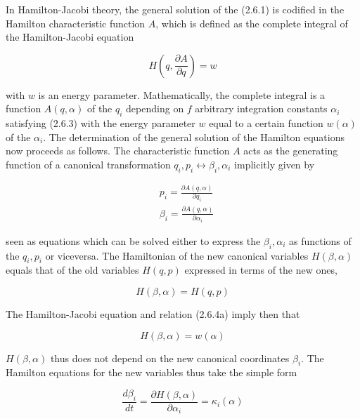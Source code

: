 \documentclass{article}
\begin{document}
In Hamilton-Jacobi theory, the general solution of the (2.6.1) is codified in the Hamilton characteristic function $A$, which is defined as the complete integral of the Hamilton-Jacobi equation
 
\begin{equation*}
H\left(q, \frac{\partial A}{\partial q}\right)=w \tag{2.6.3}
\end{equation*}
 
with $w$ is an energy parameter. Mathematically, the complete integral is a function $A(q, \alpha)$ of the $q_{i}$ depending on $f$ arbitrary integration constants $\alpha_{i}$ satisfying (2.6.3) with the energy parameter $w$ equal to a certain function $w(\alpha)$ of the $\alpha_{i}$. The determination of the general solution of the Hamilton equations now proceeds as follows. The characteristic function $A$ acts as the generating function of a canonical transformation $q_{i}, p_{i} \leftrightarrow \beta_{i}, \alpha_{i}$ implicitly given by
 
\begin{align*}
& p_{i}=\frac{\partial A(q, \alpha)}{\partial q_{i}}  \tag{2.6.4a}\\
& \beta_{i}=\frac{\partial A(q, \alpha)}{\partial \alpha_{i}} \tag{2.6.4~b}
\end{align*}
 
seen as equations which can be solved either to express the $\beta_{i}, \alpha_{i}$ as functions of the $q_{i}, p_{i}$ or viceversa. The Hamiltonian of the new canonical variables $H(\beta, \alpha)$ equals that of the old variables $H(q, p)$ expressed in terms of the new ones,
 
\begin{equation*}
H(\beta, \alpha)=H(q, p) \tag{2.6.5}
\end{equation*}
 

The Hamilton-Jacobi equation and relation (2.6.4a) imply then that
 
\begin{equation*}
H(\beta, \alpha)=w(\alpha) \tag{2.6.6}
\end{equation*}
 
$H(\beta, \alpha)$ thus does not depend on the new canonical coordinates $\beta_{i}$. The Hamilton equations for the new variables thus take the simple form
 
\begin{equation*}
\frac{d \beta_{i}}{d t}=\frac{\partial H(\beta, \alpha)}{\partial \alpha_{i}}=\kappa_{i}(\alpha) \tag{2.6.7a}
\end{equation*}
 
\end{document}
